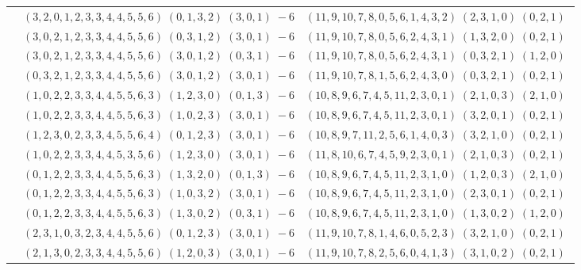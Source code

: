 \documentclass[11pt]{article}
\begin{document}
\begin{longtable}[l]{|c|c|c|}
 \cline{2-3} 
 & $(3 ,2 ,0 ,1 ,2 ,3 ,3 ,4 ,4 ,5 ,5 ,6) \;(0 ,1 ,3 ,2) \;(3 ,0 ,1) \;-6$ & $(11 ,9 ,10 ,7 ,8 ,0 ,5 ,6 ,1 ,4 ,3 ,2) \;(2 ,3 ,1 ,0) \;(0 ,2 ,1) \;$\\ 
 \cline{2-3} 
 & $(3 ,0 ,2 ,1 ,2 ,3 ,3 ,4 ,4 ,5 ,5 ,6) \;(0 ,3 ,1 ,2) \;(3 ,0 ,1) \;-6$ & $(11 ,9 ,10 ,7 ,8 ,0 ,5 ,6 ,2 ,4 ,3 ,1) \;(1 ,3 ,2 ,0) \;(0 ,2 ,1) \;$\\ 
 \cline{2-3} 
 & $(3 ,0 ,2 ,1 ,2 ,3 ,3 ,4 ,4 ,5 ,5 ,6) \;(3 ,0 ,1 ,2) \;(0 ,3 ,1) \;-6$ & $(11 ,9 ,10 ,7 ,8 ,0 ,5 ,6 ,2 ,4 ,3 ,1) \;(0 ,3 ,2 ,1) \;(1 ,2 ,0) \;$\\ 
 \cline{2-3} 
 & $(0 ,3 ,2 ,1 ,2 ,3 ,3 ,4 ,4 ,5 ,5 ,6) \;(3 ,0 ,1 ,2) \;(3 ,0 ,1) \;-6$ & $(11 ,9 ,10 ,7 ,8 ,1 ,5 ,6 ,2 ,4 ,3 ,0) \;(0 ,3 ,2 ,1) \;(0 ,2 ,1) \;$\\ 
 \cline{2-3} 
 & $(1 ,0 ,2 ,2 ,3 ,3 ,4 ,4 ,5 ,5 ,6 ,3) \;(1 ,2 ,3 ,0) \;(0 ,1 ,3) \;-6$ & $(10 ,8 ,9 ,6 ,7 ,4 ,5 ,11 ,2 ,3 ,0 ,1) \;(2 ,1 ,0 ,3) \;(2 ,1 ,0) \;$\\ 
 \cline{2-3} 
 & $(1 ,0 ,2 ,2 ,3 ,3 ,4 ,4 ,5 ,5 ,6 ,3) \;(1 ,0 ,2 ,3) \;(3 ,0 ,1) \;-6$ & $(10 ,8 ,9 ,6 ,7 ,4 ,5 ,11 ,2 ,3 ,0 ,1) \;(3 ,2 ,0 ,1) \;(0 ,2 ,1) \;$\\ 
 \cline{2-3} 
 & $(1 ,2 ,3 ,0 ,2 ,3 ,3 ,4 ,5 ,5 ,6 ,4) \;(0 ,1 ,2 ,3) \;(3 ,0 ,1) \;-6$ & $(10 ,8 ,9 ,7 ,11 ,2 ,5 ,6 ,1 ,4 ,0 ,3) \;(3 ,2 ,1 ,0) \;(0 ,2 ,1) \;$\\ 
 \cline{2-3} 
 & $(1 ,0 ,2 ,2 ,3 ,3 ,4 ,4 ,5 ,3 ,5 ,6) \;(1 ,2 ,3 ,0) \;(3 ,0 ,1) \;-6$ & $(11 ,8 ,10 ,6 ,7 ,4 ,5 ,9 ,2 ,3 ,0 ,1) \;(2 ,1 ,0 ,3) \;(0 ,2 ,1) \;$\\ 
 \cline{2-3} 
 & $(0 ,1 ,2 ,2 ,3 ,3 ,4 ,4 ,5 ,5 ,6 ,3) \;(1 ,3 ,2 ,0) \;(0 ,1 ,3) \;-6$ & $(10 ,8 ,9 ,6 ,7 ,4 ,5 ,11 ,2 ,3 ,1 ,0) \;(1 ,2 ,0 ,3) \;(2 ,1 ,0) \;$\\ 
 \cline{2-3} 
 & $(0 ,1 ,2 ,2 ,3 ,3 ,4 ,4 ,5 ,5 ,6 ,3) \;(1 ,0 ,3 ,2) \;(3 ,0 ,1) \;-6$ & $(10 ,8 ,9 ,6 ,7 ,4 ,5 ,11 ,2 ,3 ,1 ,0) \;(2 ,3 ,0 ,1) \;(0 ,2 ,1) \;$\\ 
 \cline{2-3} 
 & $(0 ,1 ,2 ,2 ,3 ,3 ,4 ,4 ,5 ,5 ,6 ,3) \;(1 ,3 ,0 ,2) \;(0 ,3 ,1) \;-6$ & $(10 ,8 ,9 ,6 ,7 ,4 ,5 ,11 ,2 ,3 ,1 ,0) \;(1 ,3 ,0 ,2) \;(1 ,2 ,0) \;$\\ 
 \cline{2-3} 
 & $(2 ,3 ,1 ,0 ,3 ,2 ,3 ,4 ,4 ,5 ,5 ,6) \;(0 ,1 ,2 ,3) \;(3 ,0 ,1) \;-6$ & $(11 ,9 ,10 ,7 ,8 ,1 ,4 ,6 ,0 ,5 ,2 ,3) \;(3 ,2 ,1 ,0) \;(0 ,2 ,1) \;$\\ 
 \cline{2-3} 
 & $(2 ,1 ,3 ,0 ,2 ,3 ,3 ,4 ,4 ,5 ,5 ,6) \;(1 ,2 ,0 ,3) \;(3 ,0 ,1) \;-6$ & $(11 ,9 ,10 ,7 ,8 ,2 ,5 ,6 ,0 ,4 ,1 ,3) \;(3 ,1 ,0 ,2) \;(0 ,2 ,1) \;$\\ 

\end{longtable}
\end{document}
